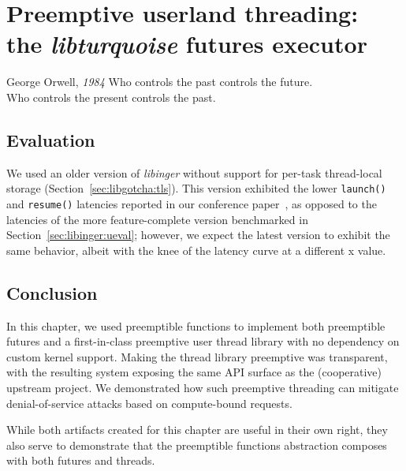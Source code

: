 \chapter{Preemptive userland threading: \\ the \textit{libturquoise} futures executor}
\label{chap:libturquoise}

\ifdefined\chapquotes
\vspace{-0.5in}
\begin{chapquote}[1.25in]{George Orwell, \textit{1984}}
Who controls the past controls the future. \\
Who controls the present controls the past.
\end{chapquote}
\fi

\begin{promotesubsections}
\begin{swallowsections}

\end{swallowsections}
\end{promotesubsections}


\section{Evaluation}




\hspace{-1em}
We used an older version of \textit{libinger} without support for per-task
thread-local storage (Section~\ref{sec:libgotcha:tls}).  This version exhibited the
lower \texttt{launch()} and \texttt{resume()} latencies reported in our conference
paper~\cite{boucher:atc2020}, as opposed to the latencies of the more
feature-complete version benchmarked in Section~\ref{sec:libinger:ueval}; however, we
expect the latest version to exhibit the same behavior, albeit with the knee of the
latency curve at a different x value.


\section{Conclusion}

In this chapter, we used preemptible functions to implement both preemptible futures
and a first-in-class preemptive user thread library with no dependency on custom
kernel support.  Making the thread library preemptive was transparent, with the
resulting system exposing the same API surface as the (cooperative) upstream project.
We demonstrated how such preemptive threading can mitigate denial-of-service attacks
based on compute-bound requests.

While both artifacts created for this chapter are useful in their own right, they
also serve to demonstrate that the preemptible functions abstraction composes with
both futures and threads.
